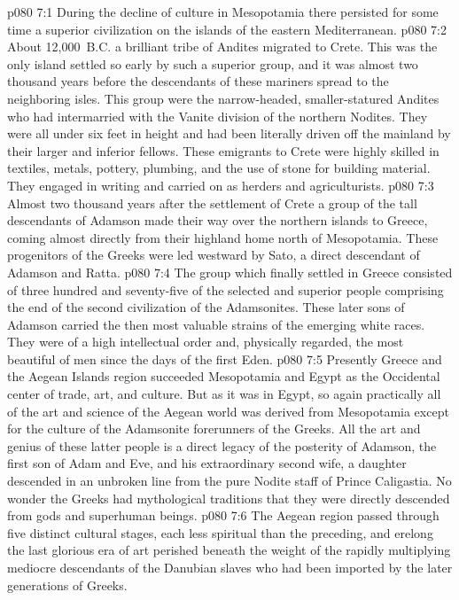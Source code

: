 \vs p080 7:1 During the decline of culture in Mesopotamia there persisted for some time a superior civilization on the islands of the eastern Mediterranean.
\vs p080 7:2 About 12,000~B.C. a brilliant tribe of Andites migrated to Crete. This was the only island settled so early by such a superior group, and it was almost two thousand years before the descendants of these mariners spread to the neighboring isles. This group were the narrow\hyp{}headed, smaller\hyp{}statured Andites who had intermarried with the Vanite division of the northern Nodites. They were all under six feet in height and had been literally driven off the mainland by their larger and inferior fellows. These emigrants to Crete were highly skilled in textiles, metals, pottery, plumbing, and the use of stone for building material. They engaged in writing and carried on as herders and agriculturists.
\vs p080 7:3 Almost two thousand years after the settlement of Crete a group of the tall descendants of Adamson made their way over the northern islands to Greece, coming almost directly from their highland home north of Mesopotamia. These progenitors of the Greeks were led westward by Sato, a direct descendant of Adamson and Ratta.
\vs p080 7:4 The group which finally settled in Greece consisted of three hundred and seventy\hyp{}five of the selected and superior people comprising the end of the second civilization of the Adamsonites. These later sons of Adamson carried the then most valuable strains of the emerging white races. They were of a high intellectual order and, physically regarded, the most beautiful of men since the days of the first Eden.
\pc \vs p080 7:5 Presently Greece and the Aegean Islands region succeeded Mesopotamia and Egypt as the Occidental center of trade, art, and culture. But as it was in Egypt, so again practically all of the art and science of the Aegean world was derived from Mesopotamia except for the culture of the Adamsonite forerunners of the Greeks. All the art and genius of these latter people is a direct legacy of the posterity of Adamson, the first son of Adam and Eve, and his extraordinary second wife, a daughter descended in an unbroken line from the pure Nodite staff of Prince Caligastia. No wonder the Greeks had mythological traditions that they were directly descended from gods and superhuman beings.
\vs p080 7:6 The Aegean region passed through five distinct cultural stages, each less spiritual than the preceding, and erelong the last glorious era of art perished beneath the weight of the rapidly multiplying mediocre descendants of the Danubian slaves who had been imported by the later generations of Greeks.
